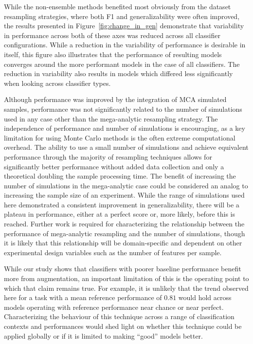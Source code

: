 \documentclass[10pt]{SelfArx} %
\begin{document}
While the non-ensemble methods benefited most obviously from the dataset resampling strategies, where both F1 and
generalizability were often improved, the results presented in Figure~\ref{fig:change_in_gen} demonstrate that
variability in performance across both of these axes was reduced across all classifier configurations. While a
reduction in the variability of performance is desirable in itself, this figure also illustrates that the performance
of resulting models converges around the more performant models in the case of all classifiers. The reduction in
variability also results in models which differed less significantly when looking across classifier types.

Although performance was improved by the integration of MCA simulated samples, performance was not significantly
related to the number of simulations used in any case other than the mega-analytic resampling strategy. The
independence of performance and number of simulations is encouraging, as a key limitation for using Monte Carlo methods
is the often extreme computational overhead. The ability to use a small number of simulations and achieve equivalent
performance through the majority of resampling techniques allows for significantly better performance without added
data collection and only a theoretical doubling the sample processing time. The benefit of increasing the number of
simulations in the mega-analytic case could be considered an analog to increasing the sample size of an experiment.
While the range of simulations used here demonstrated a consistent improvement in generalizability, there will be a
plateau in performance, either at a perfect score or, more likely, before this is reached. Further work is required for
characterizing the relationship between the performance of mega-analytic resampling and the number of simulations,
though it is likely that this relationship will be domain-specific and dependent on other experimental design variables
such as the number of features per sample.

While our study shows that classifiers with poorer baseline performance benefit more from augmentation, an important
limitation of this is the operating point to which that claim remains true. For example, it is unlikely that the trend
observed here for a task with a mean reference performance of $0.81$ would hold across models operating with reference
performance near chance or near perfect. Characterizing the behaviour of this technique across a range of
classification contexts and performances would shed light on whether this technique could be applied globally or if it
is limited to making ``good'' models better.
\end{document}
